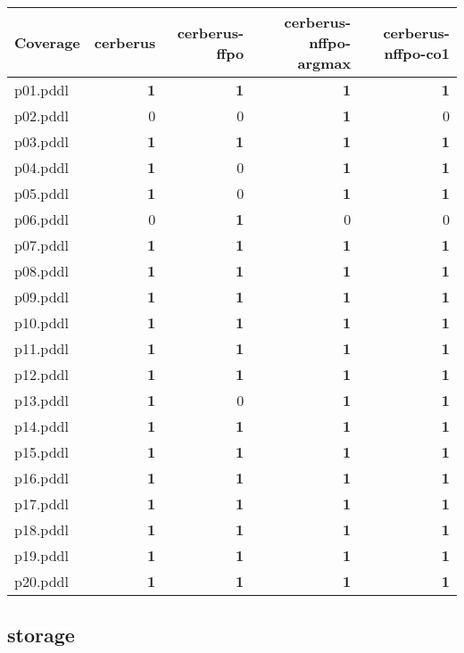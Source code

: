 \documentclass{article}
\begin{document}
\begin{tabular}{@{}lrrrr@{}}
Coverage & cerberus & cerberus-ffpo & cerberus-nffpo-argmax & cerberus-nffpo-co1 \\
\midrule
p01.pddl & \textbf{1} & \textbf{1} & \textbf{1} & \textbf{1} \\
p02.pddl & 0 & 0 & \textbf{1} & 0 \\
p03.pddl & \textbf{1} & \textbf{1} & \textbf{1} & \textbf{1} \\
p04.pddl & \textbf{1} & 0 & \textbf{1} & \textbf{1} \\
p05.pddl & \textbf{1} & 0 & \textbf{1} & \textbf{1} \\
p06.pddl & 0 & \textbf{1} & 0 & 0 \\
p07.pddl & \textbf{1} & \textbf{1} & \textbf{1} & \textbf{1} \\
p08.pddl & \textbf{1} & \textbf{1} & \textbf{1} & \textbf{1} \\
p09.pddl & \textbf{1} & \textbf{1} & \textbf{1} & \textbf{1} \\
p10.pddl & \textbf{1} & \textbf{1} & \textbf{1} & \textbf{1} \\
p11.pddl & \textbf{1} & \textbf{1} & \textbf{1} & \textbf{1} \\
p12.pddl & \textbf{1} & \textbf{1} & \textbf{1} & \textbf{1} \\
p13.pddl & \textbf{1} & 0 & \textbf{1} & \textbf{1} \\
p14.pddl & \textbf{1} & \textbf{1} & \textbf{1} & \textbf{1} \\
p15.pddl & \textbf{1} & \textbf{1} & \textbf{1} & \textbf{1} \\
p16.pddl & \textbf{1} & \textbf{1} & \textbf{1} & \textbf{1} \\
p17.pddl & \textbf{1} & \textbf{1} & \textbf{1} & \textbf{1} \\
p18.pddl & \textbf{1} & \textbf{1} & \textbf{1} & \textbf{1} \\
p19.pddl & \textbf{1} & \textbf{1} & \textbf{1} & \textbf{1} \\
p20.pddl & \textbf{1} & \textbf{1} & \textbf{1} & \textbf{1} \\
\end{tabular}

\hypertarget{coverage-storage}{}
\subsection*{storage}
\end{document}
